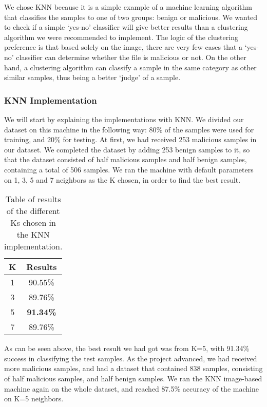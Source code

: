 \documentclass{article}
\begin{document}
\indent	We chose KNN because it is a simple example of a machine learning algorithm that classifies the samples to one of two groups: benign or malicious. We wanted to check if a simple ‘yes-no’ classifier will give better results than a clustering algorithm we were recommended to implement. The logic of the clustering preference is that based solely on the image, there are very few cases that a ‘yes-no’ classifier can determine whether the file is malicious or not. On the other hand, a clustering algorithm can classify a sample in the same category as other similar samples, thus being a better ‘judge’ of a sample.

\subsubsection{KNN Implementation}
\indent We will start by explaining the implementations with KNN. We divided our dataset on this machine in the following way: 80\% of the samples were used for training, and 20\% for testing. At first, we had received 253 malicious samples in our dataset. We completed the dataset by adding 253 benign samples to it, so that the dataset consisted of half malicious samples and half benign samples, containing a total of 506 samples. We ran the machine with default parameters on 1, 3, 5 and 7 neighbors as the K chosen, in order to find the best result.

\begin{table}[htb]
\centering
\begin{tabular}[c]{|c|c|}
\hline
K & Results\\
\hline
1 & 90.55\%\\
\hline
3 & 89.76\%\\
\hline
5 & \textbf{91.34\%}\\
\hline
7 & 89.76\%\\
\hline
\end{tabular}
\caption{Table of results of the different Ks chosen in the KNN implementation.}
\end{table}

\indent As can be seen above, the best result we had got was from K=5, with 91.34\% success in classifying the test samples. 	
\indent As the project advanced, we had received more malicious samples, and had a dataset that contained 838 samples, consisting of half malicious samples, and half benign samples. We ran the KNN image-based machine again on the whole dataset, and reached 87.5\% accuracy of the machine on K=5 neighbors.
\end{document}
